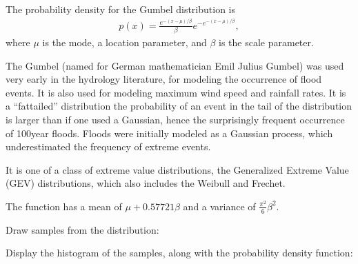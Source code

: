 \documentclass[letterpaper,10pt,english]{sphinxmanual}
\begin{document}
\begin{fulllineitems}
The probability density for the Gumbel distribution is
\begin{equation*}
\begin{split}p(x) = \frac{e^{-(x - \mu)/ \beta}}{\beta} e^{ -e^{-(x - \mu)/
\beta}},\end{split}
\end{equation*}
where \(\mu\) is the mode, a location parameter, and
\(\beta\) is the scale parameter.

The Gumbel (named for German mathematician Emil Julius Gumbel) was used
very early in the hydrology literature, for modeling the occurrence of
flood events. It is also used for modeling maximum wind speed and
rainfall rates.  It is a “fat\sphinxhyphen{}tailed” distribution \sphinxhyphen{} the probability of
an event in the tail of the distribution is larger than if one used a
Gaussian, hence the surprisingly frequent occurrence of 100\sphinxhyphen{}year
floods. Floods were initially modeled as a Gaussian process, which
underestimated the frequency of extreme events.

It is one of a class of extreme value distributions, the Generalized
Extreme Value (GEV) distributions, which also includes the Weibull and
Frechet.

The function has a mean of \(\mu + 0.57721\beta\) and a variance
of \(\frac{\pi^2}{6}\beta^2\).

Draw samples from the distribution:

\begin{sphinxVerbatim}[commandchars=\\\{\}]
     
    
\end{sphinxVerbatim}

Display the histogram of the samples, along with
the probability density function:


\end{fulllineitems}
\end{document}

